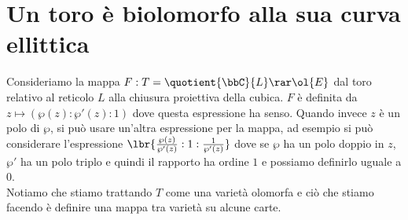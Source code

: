 \section{Un toro è biolomorfo alla sua curva ellittica}

Consideriamo la mappa $F: T = \quotient{\bbC}{L} \rar \ol{E}$ dal toro relativo al reticolo $L$ alla chiusura proiettiva della cubica. $F$ è definita da $z \mapsto (\wp(z) : \wp'(z) : 1)$ dove questa espressione ha senso. Quando invece $z$ è un polo di $\wp$, si può usare un'altra espressione per la mappa, ad esempio si può considerare l'espressione $\lbr{\frac{\wp(z)}{\wp'(z)} : 1 : \frac{1}{\wp'(z)}}$ dove se $\wp$ ha un polo doppio in $z$, $\wp'$ ha un polo triplo e quindi il rapporto ha ordine $1$ e possiamo definirlo uguale a $0$.\\
Notiamo che stiamo trattando $T$ come una varietà olomorfa e ciò che stiamo facendo è definire una mappa tra varietà su alcune carte.


